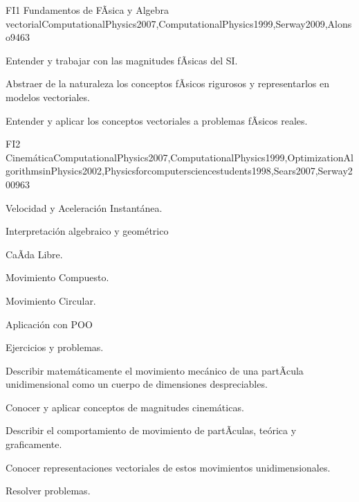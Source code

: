 \begin{syllabus}
\begin{unit}{FI1 Fundamentos de FÃ­sica y Algebra vectorial}{ComputationalPhysics2007,ComputationalPhysics1999,Serway2009,Alonso94}{6}{3}
   \begin{learningoutcomes}
      \item Entender y trabajar con las magnitudes fÃ­sicas del SI.
      \item Abstraer de la naturaleza los conceptos fÃ­sicos rigurosos y
      representarlos en modelos vectoriales.
      \item Entender y aplicar los conceptos vectoriales a problemas fÃ­sicos reales.
   \end{learningoutcomes}
\end{unit}

\begin{unit}{FI2 Cinemática}{ComputationalPhysics2007,ComputationalPhysics1999,OptimizationAlgorithmsinPhysics2002,Physicsforcomputersciencestudents1998,Sears2007,Serway2009}{6}{3}
\begin{topics}
      \item Velocidad y Aceleración Instantánea.
      \item Interpretación algebraico y geométrico
      \item CaÃ­da Libre.
      \item Movimiento Compuesto.
      \item Movimiento Circular.
      \item Aplicación con POO
      \item Ejercicios y problemas.
    \end{topics}
   \begin{learningoutcomes}
      \item Describir matemáticamente el movimiento mecánico de una partÃ­cula unidimensional como un cuerpo de dimensiones despreciables.
      \item Conocer y aplicar conceptos de magnitudes cinemáticas.
      \item Describir el comportamiento de movimiento de partÃ­culas, teórica y graficamente.
      \item Conocer representaciones vectoriales de estos movimientos unidimensionales.
      \item Resolver problemas.
   \end{learningoutcomes}
\end{unit}


\end{syllabus}

